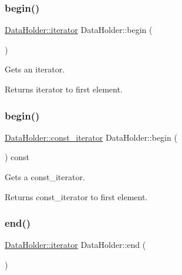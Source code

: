 \subsubsection{\texorpdfstring{begin()}{begin()}\hspace{0.1cm}{\footnotesize\ttfamily [1/2]}}
{\footnotesize\ttfamily \hyperlink{classDataHolder_afc27d248b4761952f2318a18ad5a2a15}{Data\+Holder\+::iterator} Data\+Holder\+::begin (\begin{DoxyParamCaption}{ }\end{DoxyParamCaption})}

Gets an iterator. \begin{DoxyReturn}{Returns}
iterator to first element. 
\end{DoxyReturn}
\mbox{\label{classDataHolder_a05afb99b3d1ea784b415bae839e1c4c5}} 
\subsubsection{\texorpdfstring{begin()}{begin()}\hspace{0.1cm}{\footnotesize\ttfamily [2/2]}}
{\footnotesize\ttfamily \hyperlink{classDataHolder_a396f5981e656ed389de16190968a2bf8}{Data\+Holder\+::const\+\_\+iterator} Data\+Holder\+::begin (\begin{DoxyParamCaption}{ }\end{DoxyParamCaption}) const}

Gets a const\+\_\+iterator. \begin{DoxyReturn}{Returns}
const\+\_\+iterator to first element. 
\end{DoxyReturn}
\mbox{\label{classDataHolder_a082001b8e93cf0aa1500677e4156b618}} 
\subsubsection{\texorpdfstring{end()}{end()}\hspace{0.1cm}{\footnotesize\ttfamily [1/2]}}
{\footnotesize\ttfamily \hyperlink{classDataHolder_afc27d248b4761952f2318a18ad5a2a15}{Data\+Holder\+::iterator} Data\+Holder\+::end (\begin{DoxyParamCaption}{ }\end{DoxyParamCaption})}

